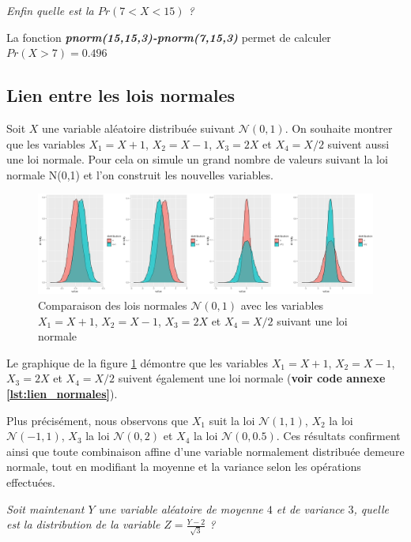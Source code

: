             \begin{center}
                \textit{Enfin quelle est la $Pr(7<X<15)$ ?}
            \end{center}
            \noindent La fonction \textbf{\textit{pnorm(15,15,3)-pnorm(7,15,3)}} permet de calculer $Pr(X>7)= 0.496$

    \subsection{Lien entre les lois normales}

    Soit $X$ une variable aléatoire distribuée suivant $\mathcal N(0,1)$.
    On souhaite montrer que les variables $X_1=X+1$, $X_2=X-1$, $X_3=2X$ et $X_4=X/2$ suivent aussi une loi normale. 
    Pour cela on simule un grand nombre de valeurs suivant la loi normale N(0,1) et l’on construit les nouvelles variables.

    \begin{figure}[H]
        \centering
        \includegraphics[width=1\textwidth]{4_attachments/figures/output28.png}
        \caption{Comparaison des lois normales $\mathcal N(0,1)$ avec les variables $X_1=X+1$, $X_2=X-1$, $X_3=2X$ et $X_4=X/2$ suivant une loi normale}                
        \label{fig:comparaison_loi_normales}
    \end{figure}

    Le graphique de la figure \ref{fig:comparaison_loi_normales} démontre que les variables $X_1=X+1$, $X_2=X-1$, $X_3=2X$ et $X_4=X/2$ suivent également une loi normale (\textbf{voir code annexe \ref{lst:lien_normales}}).

    \noindent Plus précisément, nous observons que $X_1$ suit la loi $\mathcal{N}(1,1)$, $X_2$ la loi $\mathcal{N}(-1,1)$, $X_3$ la loi $\mathcal{N}(0,2)$ et $X_4$ la loi $\mathcal{N}(0,0.5)$. 
    Ces résultats confirment ainsi que toute combinaison affine d'une variable normalement distribuée demeure normale, tout en modifiant la moyenne et la variance selon les opérations effectuées.

    \begin{center}
        \textit{Soit maintenant $Y$ une variable aléatoire de moyenne $4$ et de variance $3$, quelle est la distribution de la variable $Z=\frac{Y-2}{\sqrt{3}}$ ?}
    \end{center}

